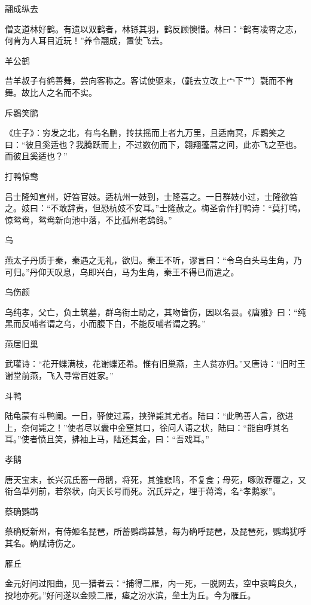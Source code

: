 \documentclass[a4paper,12pt,UTF8,twoside]{ctexbook}
\begin{document}
    翮成纵去
    
    僧支道林好鹤。有遗以双鹤者，林铩其羽，鹤反顾懊惜。林曰：“鹤有凌霄之志，何肯为人耳目近玩！”养令翮成，置使飞去。
    
    羊公鹤
    
    昔羊叔子有鹤善舞，尝向客称之。客试使驱来，（氃去立改上宀下艹）氋而不肯舞。故比人之名而不实。
    
    斥鷃笑鹏
    
    《庄子》：穷发之北，有鸟名鹏，抟扶摇而上者九万里，且适南冥，斥鷃笑之曰：“彼且奚适也？我腾跃而上，不过数仞而下，翱翔蓬蒿之间，此亦飞之至也。而彼且奚适也？”
    
    打鸭惊鸯
    
    吕士隆知宣州，好笞官妓。适杭州一妓到，士隆喜之。一日群妓小过，士隆欲笞之。妓曰：“不敢辞责，但恐杭妓不安耳。”士隆赦之。梅圣俞作打鸭诗：“莫打鸭，惊鸳鸯，鸳鸯新向池中落，不比孤州老鸹鸧。”
    
    乌
    
    燕太子丹质于秦，秦遇之无礼，欲归。秦王不听，谬言曰：“令乌白头马生角，乃可归。”丹仰天叹息，乌即兴白，马为生角，秦王不得已而遣之。
    
    乌伤颜
    
    乌纯孝，父亡，负土筑墓，群乌衔土助之，其吻皆伤，因以名县。《唐雅》曰：“纯黑而反哺者谓之乌，小而腹下白，不能反哺者谓之鸦。”
    
    燕居旧巢
    
    武瓘诗：“花开蝶满枝，花谢蝶还希。惟有旧巢燕，主人贫亦归。”又唐诗：“旧时王谢堂前燕，飞入寻常百姓家。”
    
    斗鸭
    
    陆龟蒙有斗鸭阑。一日，驿使过焉，挟弹毙其尤者。陆曰：“此鸭善人言，欲进上，奈何毙之！”使者尽以囊中金窒其口，徐问人语之状，陆曰：“能自呼其名耳。”使者愤且笑，拂袖上马，陆还其金，曰：“吾戏耳。”
    
    孝鹅
    
    唐天宝末，长兴沉氏畜一母鹅，将死，其雏悲鸣，不复食；母死，啄败荐覆之，又衔刍草列前，若祭状，向天长号而死。沉氏异之，埋于蒋湾，名“孝鹅冢”。
    
    蔡确鹦鹉
    
    蔡确贬新州，有侍姬名琵琶，所蓄鹦鹉甚慧，每为确呼琵琶，及琵琶死，鹦鹉犹呼其名。确赋诗伤之。
    
    雁丘
    
    金元好问过阳曲，见一猎者云：“捕得二雁，内一死，一脱网去，空中哀鸣良久，投地亦死。”好问遂以金赎二雁，瘗之汾水滨，垒土为丘。今为雁丘。
    
\end{document}
